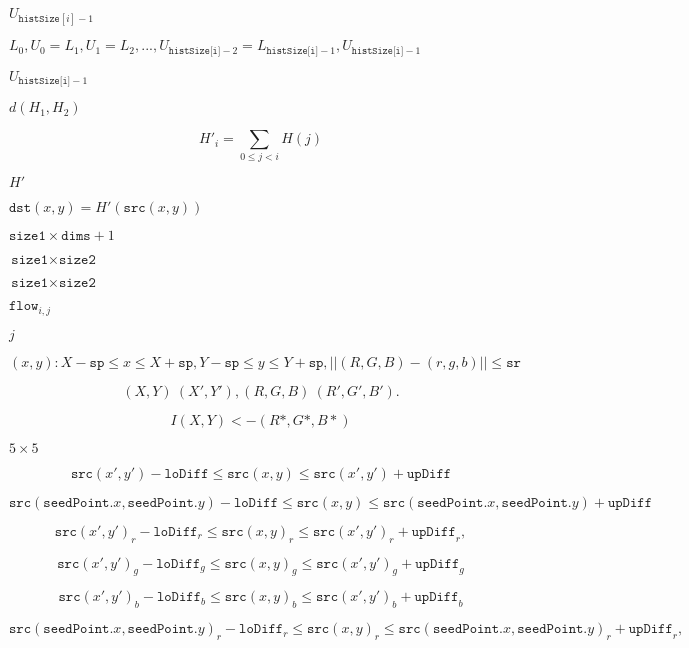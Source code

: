 \documentclass{article}
\begin{document}
$U_{\texttt{histSize}[i]-1}$
\pagebreak

$L_0, U_0=L_1, U_1=L_2, ..., U_{\texttt{histSize[i]}-2}=L_{\texttt{histSize[i]}-1}, U_{\texttt{histSize[i]}-1}$
\pagebreak

$U_{\texttt{histSize[i]}-1}$
\pagebreak

$d(H_1, H_2)$
\pagebreak

\[H'_i = \sum _{0 \le j < i} H(j)\]
\pagebreak

$H'$
\pagebreak

$\texttt{dst}(x,y) = H'(\texttt{src}(x,y))$
\pagebreak

$\texttt{size1}\times \texttt{dims}+1$
\pagebreak

$\texttt{size1}\times \texttt{size2}$
\pagebreak

$\texttt{size1} \times \texttt{size2}$
\pagebreak

$\texttt{flow}_{i,j}$
\pagebreak

$j$
\pagebreak

\[(x,y): X- \texttt{sp} \le x \le X+ \texttt{sp} , Y- \texttt{sp} \le y \le Y+ \texttt{sp} , ||(R,G,B)-(r,g,b)|| \le \texttt{sr}\]
\pagebreak

\[(X,Y)~(X',Y'), (R,G,B)~(R',G',B').\]
\pagebreak

\[I(X,Y) <- (R*,G*,B*)\]
\pagebreak

$5\times 5$
\pagebreak

\[\texttt{src} (x',y')- \texttt{loDiff} \leq \texttt{src} (x,y) \leq \texttt{src} (x',y')+ \texttt{upDiff}\]
\pagebreak

\[\texttt{src} ( \texttt{seedPoint} .x, \texttt{seedPoint} .y)- \texttt{loDiff} \leq \texttt{src} (x,y) \leq \texttt{src} ( \texttt{seedPoint} .x, \texttt{seedPoint} .y)+ \texttt{upDiff}\]
\pagebreak

\[\texttt{src} (x',y')_r- \texttt{loDiff} _r \leq \texttt{src} (x,y)_r \leq \texttt{src} (x',y')_r+ \texttt{upDiff} _r,\]
\pagebreak

\[\texttt{src} (x',y')_g- \texttt{loDiff} _g \leq \texttt{src} (x,y)_g \leq \texttt{src} (x',y')_g+ \texttt{upDiff} _g\]
\pagebreak

\[\texttt{src} (x',y')_b- \texttt{loDiff} _b \leq \texttt{src} (x,y)_b \leq \texttt{src} (x',y')_b+ \texttt{upDiff} _b\]
\pagebreak

\[\texttt{src} ( \texttt{seedPoint} .x, \texttt{seedPoint} .y)_r- \texttt{loDiff} _r \leq \texttt{src} (x,y)_r \leq \texttt{src} ( \texttt{seedPoint} .x, \texttt{seedPoint} .y)_r+ \texttt{upDiff} _r,\]
\pagebreak
\end{document}
